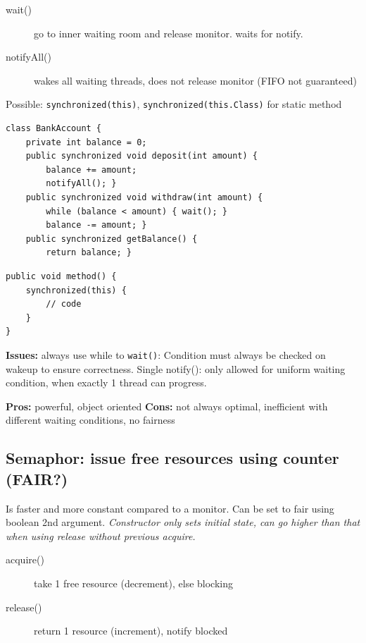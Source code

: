 \begin{description}
  \item[wait()] go to inner waiting room and release monitor. waits for notify.
  \item[notifyAll()] wakes all waiting threads, does not release monitor (FIFO not guaranteed)
\end{description}

Possible: \texttt{synchronized(this)}, \texttt{synchronized(this.Class)} for static method
\begin{lstlisting}[style=java]
class BankAccount {
	private int balance = 0;
	public synchronized void deposit(int amount) {
		balance += amount;
		notifyAll(); }
	public synchronized void withdraw(int amount) {
		while (balance < amount) { wait(); }
		balance -= amount; }
	public synchronized getBalance() {
		return balance; }
\end{lstlisting}
\vspace{-1mm}
\begin{minipage}[t]{0.5\linewidth}
\begin{lstlisting}[style=java]
public void method() {
	synchronized(this) {
		// code
	}
}
\end{lstlisting}
\end{minipage}
\begin{minipage}[t]{0.5\linewidth}
  \vspace{1mm}
\textbf{Issues:} always use while to \texttt{wait()}: Condition must always be checked on wakeup to ensure correctness.
Single notify(): only allowed for uniform waiting condition, when exactly 1 thread can progress.
\end{minipage}

\textbf{Pros:} powerful, object oriented \textbf{Cons:} not always optimal, inefficient with different waiting conditions, no fairness 

\subsection{Semaphor: issue free resources using counter (FAIR?)}
Is faster and more constant compared to a monitor. Can be set to fair using boolean 2nd argument. \textit{Constructor only sets initial state, can go higher than that when using release without previous acquire.}
\begin{description}
  \item[acquire()] take 1 free resource (decrement), else blocking
  \item[release()] return 1 resource (increment), notify blocked
\end{description}

